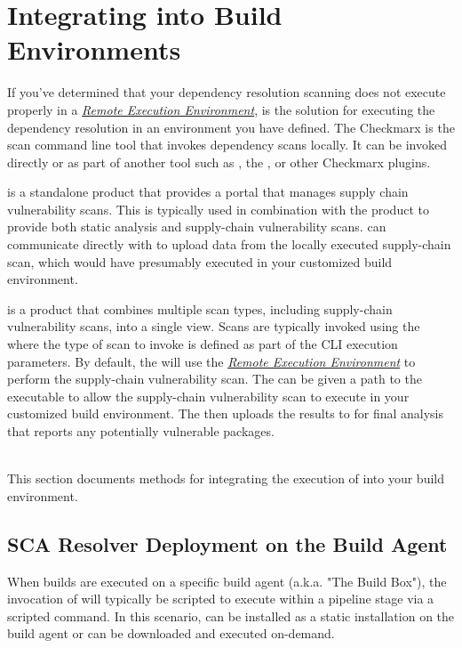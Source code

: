 \chapter{Integrating \scaresolver into Build Environments}\label{chap:ext_build_env}

If you've determined that your dependency resolution scanning does not execute properly
in a \hyperref[sssec:remote_environment]{\textit{Remote Execution Environment}}, \scaresolver
is the solution for executing the dependency resolution in an environment you have defined.
The Checkmarx \scaresolver is the scan command line tool that invokes 
dependency scans locally.  It can be invoked directly or as part of another
tool such as \cxflow, the \cxonecli, or other Checkmarx plugins.

\cxsca is a standalone product that provides a portal that manages supply chain vulnerability scans.  This is
typically used in combination with the \cxsast product to provide both static analysis and supply-chain vulnerability
scans.  \scaresolver can communicate directly with \cxsca to upload data from the locally executed supply-chain
scan, which would have presumably executed in your customized build environment.

\cxone is a product that combines multiple scan types, including supply-chain vulnerability scans, into a single
view.  Scans are typically invoked using the \cxonecli where the type of scan to invoke is defined as part
of the CLI execution parameters.  By default, the \cxonecli will use the 
\hyperref[sssec:remote_environment]{\textit{Remote Execution Environment}} to perform the supply-chain
vulnerability scan.  The \cxonecli can be given a path to the \scaresolver executable to allow
the supply-chain vulnerability scan to execute in your customized build environment.  The \cxonecli then uploads
the results to \cxone for final analysis that reports any potentially vulnerable packages.


\noindent\\This section documents methods for integrating the execution of \scaresolver into your
build environment.


\section{SCA Resolver Deployment on the Build Agent}

When builds are executed on a specific build agent (a.k.a. "The Build Box"),
the invocation of \scaresolver will typically be scripted to execute
within a pipeline stage via a scripted command.  In this scenario,
\scaresolver can be installed as a static installation on the build
agent or can be downloaded and executed on-demand.

